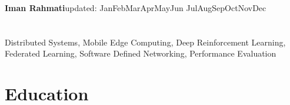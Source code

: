 \documentclass[11pt]{article}
\makeatletter
\newcommand*{\eduWithDetail}[5]
{\begin{table}[h!]
	\begin{tabular*}{\textwidth}{ll@{\extracolsep{\fill}}r}
		\textbf{#1} &  #2 & \\ %
		#3 &  & \\
		\multicolumn{3}{l}{#5}
	\end{tabular*}
\end{table}}
\newcommand*{\multilineCell}[1]
{\begin{tabular}[c]{@{}l@{}} #1
\end{tabular}}
\def\today{\number\day \space \ifcase\month\or
	Jan\or Feb\or Mar\or Apr\or May\or Jun\or
	Jul\or Aug\or Sep\or Oct\or Nov\or Dec\fi
	\space \number\year}
\makeatother
\begin{document}
	

	
%         
{\noindent \huge\bfseries Iman Rahmati}\hfill{\footnotesize updated: \today}
\vspace{-1cm}
\section{}
 \vspace{-2mm}

 Distributed Systems, Mobile Edge Computing, Deep Reinforcement Learning, Federated Learning, Software Defined Networking, Performance Evaluation
\vspace{-2mm}
\section{Education}



\vspace{-5mm}
\end{document}
